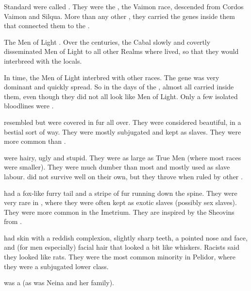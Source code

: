 \begin{gloss}
    
    Standard \humans were called \quo{\truehumans}. 
    They were the , the Vaimon race, descended from Cordos Vaimon and Silqua. 
    More than any other \humans, they carried the genes inside them that connected them to the  \matrix.
    
    The Men of Light .
    Over the centuries, the Cabal slowly and covertly disseminated Men of Light to all other Realms where \humans lived, so that they would interbreed with the locals. 
    
    In time, the Men of Light interbred with other \demihuman races. 
    The \Lithrim gene was very dominant and quickly spread. 
    So in the days of the \thirdbanewar, almost all \humans carried \Lithrim inside them, even though they did not all look like Men of Light. 
    Only a few isolated \human bloodlines were . 
    
  \gitem{\feere}
    \Feeres resembled \sheomirs but were covered in fur all over.
    They were considered beautiful, in a bestial sort of way.
    They were mostly subjugated and kept as slaves. 
    They were more common than \sheomirs.
    
  \gitem{\glune}
    \Glunes were hairy, ugly and stupid.
    They were as large as True Men (where most \demihuman races were smaller). 
    They were much dumber than most \humans and mostly used as slave labour. 
    \Glunes did not survive well on their own, but they throve when ruled by other \humans.

  \gitem{\sheomir}
    \Sheomirs had a fox-like furry tail and a stripe of fur running down the spine. 
    They were very rare in \Velcad, where they were often kept as exotic slaves (possibly sex slaves). 
    They were more common in the Imetrium.
    They are inspired by the Sheovins from \cite{NykiBlatchley:KaydanaandtheStaffofIshlun}. 

  \gitem{\tulan}
    \Tulans had skin with a reddish complexion, slightly sharp teeth, a pointed nose and face, and (for men especially) facial hair that looked a bit like whiskers. 
    Racists said they looked like rats. 
    They were the most common minority in Pelidor, where they were a subjugated lower class. 
    
     was a \tulan (as was Neina and her family).
 

\end{gloss}
